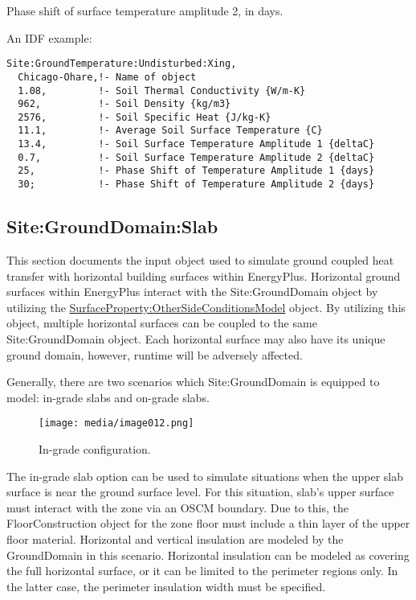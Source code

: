 Phase shift of surface temperature amplitude 2, in days.

An IDF example:

\begin{lstlisting}
Site:GroundTemperature:Undisturbed:Xing,
  Chicago-Ohare,!- Name of object
  1.08,         !- Soil Thermal Conductivity {W/m-K}
  962,          !- Soil Density {kg/m3}
  2576,         !- Soil Specific Heat {J/kg-K}
  11.1,         !- Average Soil Surface Temperature {C}
  13.4,         !- Soil Surface Temperature Amplitude 1 {deltaC}
  0.7,          !- Soil Surface Temperature Amplitude 2 {deltaC}
  25,           !- Phase Shift of Temperature Amplitude 1 {days}
  30;           !- Phase Shift of Temperature Amplitude 2 {days}
\end{lstlisting}

\subsection{Site:GroundDomain:Slab}\label{sitegrounddomainslab}

This section documents the input object used to simulate ground coupled heat transfer with horizontal building surfaces within EnergyPlus. Horizontal ground surfaces within EnergyPlus interact with the Site:GroundDomain object by utilizing the \hyperref[surfacepropertyothersideconditionsmodel]{SurfaceProperty:OtherSideConditionsModel} object. By utilizing this object, multiple horizontal surfaces can be coupled to the same Site:GroundDomain object. Each horizontal surface may also have its unique ground domain, however, runtime will be adversely affected.

Generally, there are two scenarios which Site:GroundDomain is equipped to model: in-grade slabs and on-grade slabs.

\begin{figure}[htbp]
\centering
\texttt{[image: media/image012.png]}
\caption{In-grade configuration. \protect \label{fig:in-grade-configuration}}
\end{figure}

The in-grade slab option can be used to simulate situations when the upper slab surface is near the ground surface level. For this situation, slab's upper surface must interact with the zone via an OSCM boundary. Due to this, the FloorConstruction object for the zone floor must include a thin layer of the upper floor material. Horizontal and vertical insulation are modeled by the GroundDomain in this scenario. Horizontal insulation can be modeled as covering the full horizontal surface, or it can be limited to the perimeter regions only. In the latter case, the perimeter insulation width must be specified.

